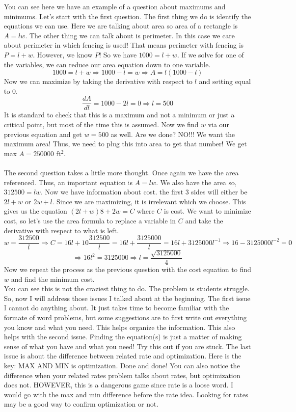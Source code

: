 \documentclass[10pt]{article}
\theoremstyle{Theorem}
\theoremstyle{definition}
\theoremstyle{remark}
\theoremstyle{custom}
\begin{document}
You can see here we have an example of a question about maximums and minimums. Let's start with the first question. The first thing we do is identify the equations we can use. Here we are talking about area so area of a rectangle is $A=lw$. The other thing we can talk about is perimeter. In this case we care about perimeter in which fencing is used! That means perimeter with fencing is $P=l+w$. However, we know $P$! So we have $1000=l+w$. If we solve for one of the variables, we can reduce our area equation down to one variable. 
\[
1000=l+w\Rightarrow 1000-l=w \Rightarrow A=l(1000-l)
\]
Now we can maximize by taking the derivative with respect to $l$ and setting equal to 0.
\[
\dfrac{dA}{dl}=1000-2l=0 \Rightarrow l=500
\]
It is standard to check that this is a maximum and not a minimum or just a critical point, but most of the time this is assumed. Now we find $w$ via our previous equation and get $w=500$ as well. Are we done? NO!!! We want the maximum area! Thus, we need to plug this into area to get that number! We get max $A=250000$ ft$^2$. \\\\
The second question takes a little more thought. Once again we have the area referenced. Thus, an important equation is $A=lw$. We also have the area so, $312500=lw$. Now we have information about cost. the first 3 sides will either be $2l+w$ or $2w+l$. Since we are maximizing, it is irrelevant which we choose. This gives us the equation $(2l+w)8+2w=C$ where $C$ is cost. We want to minimize cost, so let's use the area formula to replace a variable in $C$ and take the derivative with respect to what is left.
\[
w=\dfrac{312500}{l}\Rightarrow C=16l+10\dfrac{312500}{l}=16l+\dfrac{3125000}{l}=16l+3125000l^{-1} \Rightarrow 16-3125000l^{-2}=0
\]
\[
\Rightarrow 16l^2=3125000 \Rightarrow l=\dfrac{\sqrt{3125000}}{4}
\]
Now we repeat the process as the previous question with the cost equation to find $w$ and find the minimum cost.\\
You can see this is not the craziest thing to do. The problem is students struggle. So, now I will address those issues I talked about at the beginning. The first issue I cannot do anything about. It just takes time to become familiar with the formate of word problems, but some suggestions are to first write out everything you know and what you need. This helps organize the information. This also helps with the second issue. Finding the equation(s) is just a matter of making sense of what you have and what you need! Try this out if you are stuck. The last issue is about the difference between related rate and optimization. Here is the key: MAX AND MIN is optimization. Done and done! You can also notice the difference when your related rates problem talks about rates, but optimization does not. HOWEVER, this is a dangerous game since rate is a loose word. I would go with the max and min difference before the rate idea. Looking for rates may be a good way to confirm optimization or not.
\end{document}
